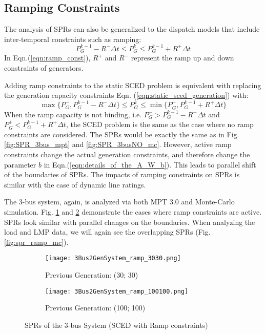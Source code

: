 \documentclass[letterpaper, 11pt]{article}
\theoremstyle{plain}
\theoremstyle{definition}
\begin{document}
\subsection{Ramping Constraints} \label{sub:ramping_constraints}
The analysis of SPRs can also be generalized to the dispatch models that include inter-temporal constraints such as ramping:
\begin{equation}
\label{eqn:ramp_const}
  P_G^{k-1} - R^- \Delta t \le P_G^k  \le P_G^{k-1} + R^+ \Delta t
\end{equation}
In Eqn.(\ref{eqn:ramp_const}), $R^+$ and $R^-$ represent the ramp up and down constraints of generators.


Adding ramp constraints to the static SCED problem is equivalent with replacing the generation capacity constraints Eqn. (\ref{eqn:static_sced_generation}) with:
\begin{equation}
\label{eqn:revise_generation_limits}
\max\{P_G^-, P_G^{k-1} - R^- \Delta t\} \le P_G^k  \le \min\{P_G^+, P_G^{k-1} + R^+ \Delta t\}
\end{equation}
When the ramp capacity is not binding, i.e. $P_G^- > P_G^{k-1} - R^- \Delta t$ and $P_G^+ < P_G^{k-1} + R^+ \Delta t$, the SCED problem is the same as the case where no ramp constraints are considered. The SPRs would be exactly the same as in Fig. \ref{fig:SPR_3bus_mpt} and \ref{fig:SPR_3busNO_mc}.
However, active ramp constraints change the actual generation constraints, and therefore change the parameter $b$ in Eqn.(\ref{eqn:details_of_the_A_W_b}). 
This leads to parallel shift of the boundaries of SPRs. The impacts of ramping constraints on SPRs is similar with the case of dynamic line ratings.


The 3-bus system, again, is analyzed via both MPT 3.0 and Monte-Carlo simulation. 
Fig. \ref{fig:ramp_3030} and \ref{fig:ramp_100100} demonstrate the cases where ramp constraints are active. SPRs look similar with parallel changes on the boundaries. 
When analyzing the load and LMP data, we will again see the overlapping SPRs (Fig. \ref{fig:spr_ramp_mc}). 


\begin{figure}[htbp]
  \centering
  \begin{subfigure}[t]{0.49\linewidth}
  \centering
  \texttt{[image: 3Bus2GenSystem\_ramp\_3030.png]}
  \caption{Previous Generation: (30; 30)}
  \label{fig:ramp_3030}
  \end{subfigure}
  \begin{subfigure}[t]{0.49\linewidth}
  \centering
  \texttt{[image: 3Bus2GenSystem\_ramp\_100100.png]}
  \caption{Previous Generation: (100; 100)}
 \label{fig:ramp_100100}
  \end{subfigure}  
  \caption{SPRs of the 3-bus System (SCED with Ramp constraints)}
  \label{fig:spr_ramp_mpt}
\end{figure}
\end{document}
